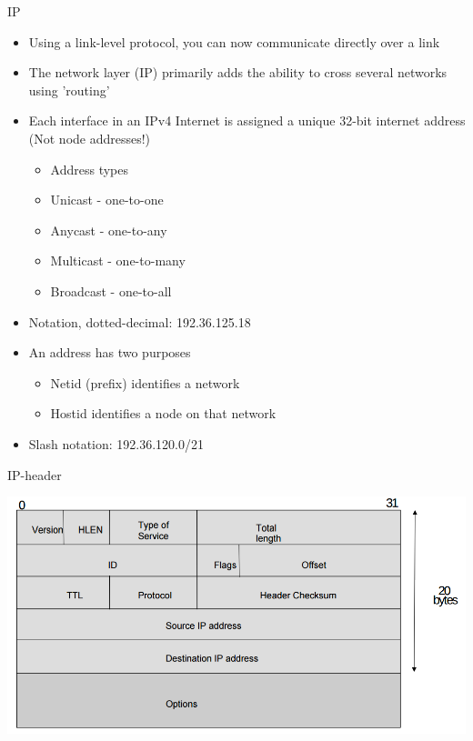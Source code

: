 \documentclass{beamer}
\begin{document}
\begin{frame}{IP}
  \begin{itemize}
  \item Using a link-level protocol, you can now communicate
    directly over a link
  \item The network layer (IP) primarily adds the ability to cross
    several networks using 'routing'
  \item Each interface in an IPv4 Internet is assigned a unique 32-bit
internet address (Not node addresses!)
  \begin{itemize}
\item Address types
\item Unicast - one-to-one
\item Anycast - one-to-any
\item Multicast - one-to-many
\item Broadcast - one-to-all
  \end{itemize}
\item Notation, dotted-decimal: 192.36.125.18
\item An address has two purposes
  \begin{itemize}
\item Netid (prefix) identifies a network
\item Hostid identifies a node on that network
  \end{itemize}
\item Slash notation: 192.36.120.0/21
  \end{itemize}
\end{frame}

\begin{frame}{IP-header}
  \begin{center}
    \includegraphics[width=0.9\linewidth]{IP-header}
  \end{center}
\end{frame}
\end{document}
